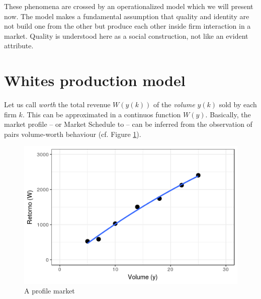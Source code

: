 \documentclass[a4paper, 12pt, openright, oneside, german, french, brazil, english]{abntex2}
\begin{document}

	These phenomena are crossed by an operationalized model which we will present now. The model makes a fundamental assumption that quality and identity are not build one from the other but produce each other inside firm interaction in a market. Quality is understood here as a social construction, not like an evident attribute.
	
	\section{Whites production model}
	
	
	Let us call \textit{worth} the total revenue $W(y(k))$ of the \textit{volume} $y(k)$ sold by each firm $k$. This can be approximated in a continuos function $W(y)$. Basically, the market profile -- or Market Schedule to  -- can be inferred from the observation of pairs volume-worth behaviour (cf. Figure \ref{white_1.2}). 
	
	
	\begin{figure}[ht]
		\centering
		\caption{A profile market}
		\label{white_1.2}
		\includegraphics[scale=1]{white_1_2.png}
	\end{figure}
	
\end{document}

